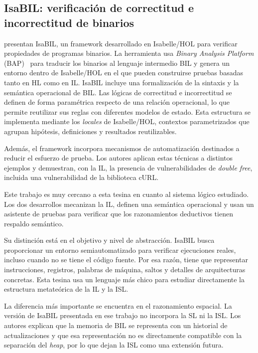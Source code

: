 \documentclass[a4paper,	11pt]{report}
\begin{document}
\subsection*{IsaBIL: verificación de correctitud e incorrectitud de binarios}
\citet{isabil} presentan IsaBIL,
un framework desarrollado en Isabelle/HOL para verificar propiedades de programas binarios.
La herramienta usa \emph{Binary Analysis Platform} (BAP)~\citep{bap} para traducir los binarios al lenguaje intermedio BIL
y genera un entorno dentro de Isabelle/HOL en el que pueden construirse pruebas basadas tanto en HL como en IL.
IsaBIL incluye una formalización de la sintaxis y la semántica operacional de BIL.
Las lógicas de correctitud e incorrectitud se definen de forma paramétrica respecto de una relación operacional,
lo que permite reutilizar sus reglas con diferentes modelos de estado.
Esta estructura se implementa mediante los \emph{locales} de Isabelle/HOL,
contextos parametrizados que agrupan hipótesis,
definiciones y resultados reutilizables.

Además,
el framework incorpora mecanismos de automatización destinados a reducir el esfuerzo de prueba.
Los autores aplican estas técnicas a distintos ejemplos y demuestran, con la IL,
la presencia de vulnerabilidades de \emph{double free},
incluida una vulnerabilidad de la biblioteca cURL.

Este trabajo es muy cercano a esta tesina en cuanto al sistema lógico estudiado.
Los dos desarrollos mecanizan la IL,
definen una semántica operacional y usan un asistente de pruebas para verificar que los razonamientos deductivos tienen respaldo semántico.

Su distinción está en el objetivo y nivel de abstracción.
IsaBIL busca proporcionar un entorno semiautomatizado para verificar ejecuciones reales,
incluso cuando no se tiene el código fuente.
Por esa razón, tiene que representar instrucciones,
registros, palabras de máquina, saltos y detalles de arquitecturas concretas.
Esta tesina usa un lenguaje más chico para estudiar directamente la estructura metateórica de la IL y la ISL.

La diferencia más importante se encuentra en el razonamiento espacial.
La versión de IsaBIL presentada en ese trabajo no incorpora la SL ni la ISL.
Los autores explican que la memoria de BIL se representa con un historial de actualizaciones y que esa representación
no es directamente compatible con la separación del \emph{heap},
por lo que dejan la ISL como una extensión futura.
\end{document}
